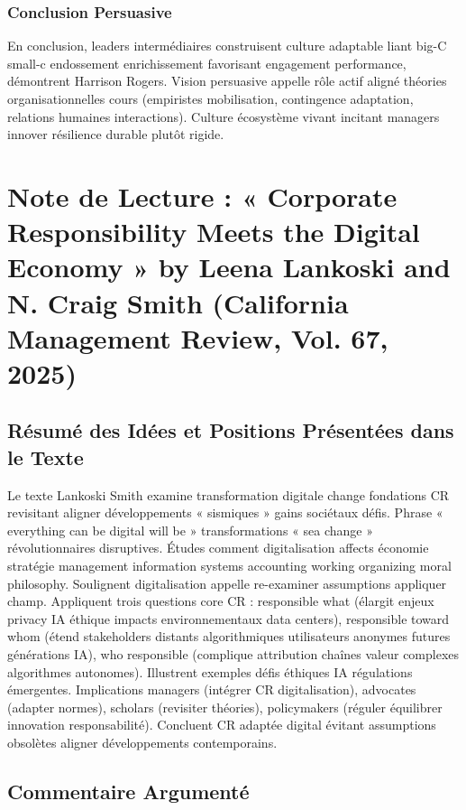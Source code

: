 \documentclass[11pt]{rapportECL}
\begin{document}
\subsubsection{Conclusion Persuasive}
En conclusion, leaders intermédiaires construisent culture adaptable liant big-C small-c endossement enrichissement favorisant engagement performance, démontrent Harrison Rogers. Vision persuasive appelle rôle actif aligné théories organisationnelles cours (empiristes mobilisation, contingence adaptation, relations humaines interactions). Culture écosystème vivant incitant managers innover résilience durable plutôt rigide.

\section{Note de Lecture : « Corporate Responsibility Meets the Digital Economy » by Leena Lankoski and N. Craig Smith (California Management Review, Vol. 67, 2025)}

\subsection{Résumé des Idées et Positions Présentées dans le Texte}
Le texte Lankoski Smith examine transformation digitale change fondations CR revisitant aligner développements « sismiques » gains sociétaux défis. Phrase « everything can be digital will be » transformations « sea change » révolutionnaires disruptives. Études comment digitalisation affects économie stratégie management information systems accounting working organizing moral philosophy. Soulignent digitalisation appelle re-examiner assumptions appliquer champ. Appliquent trois questions core CR : responsible what (élargit enjeux privacy IA éthique impacts environnementaux data centers), responsible toward whom (étend stakeholders distants algorithmiques utilisateurs anonymes futures générations IA), who responsible (complique attribution chaînes valeur complexes algorithmes autonomes). Illustrent exemples défis éthiques IA régulations émergentes. Implications managers (intégrer CR digitalisation), advocates (adapter normes), scholars (revisiter théories), policymakers (réguler équilibrer innovation responsabilité). Concluent CR adaptée digital évitant assumptions obsolètes aligner développements contemporains.

\subsection{Commentaire Argumenté}
\end{document}
